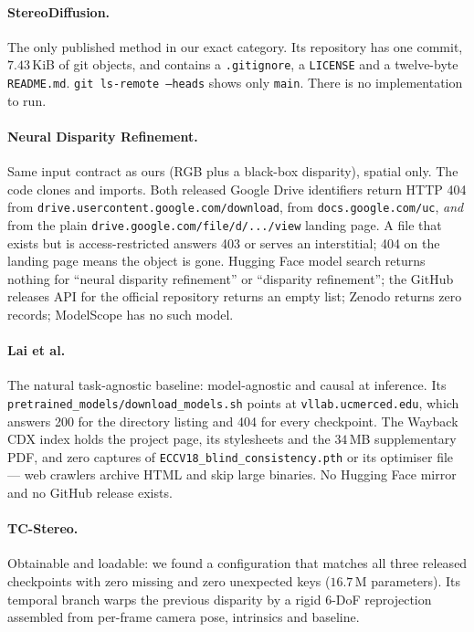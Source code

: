 \documentclass[letterpaper,10pt,conference]{ieeeconf}
\begin{document}
\paragraph{StereoDiffusion.} The only published method in our exact
category. Its repository has one commit, $7.43$\,KiB of git objects, and
contains a \texttt{.gitignore}, a \texttt{LICENSE} and a twelve-byte
\texttt{README.md}. \texttt{git ls-remote --heads} shows only
\texttt{main}. There is no implementation to run.

\paragraph{Neural Disparity Refinement.} Same input contract as ours
(RGB plus a black-box disparity), spatial only. The code clones and
imports. Both released Google Drive identifiers return HTTP 404 from
\texttt{drive.usercontent.google.com/download}, from
\texttt{docs.google.com/uc}, \emph{and} from the plain
\texttt{drive.google.com/file/d/.../view} landing page. A file that
exists but is access-restricted answers 403 or serves an interstitial;
404 on the landing page means the object is gone. Hugging Face model
search returns nothing for ``neural disparity refinement'' or
``disparity refinement''; the GitHub releases API for the official
repository returns an empty list; Zenodo returns zero records;
ModelScope has no such model.

\paragraph{Lai et al.} The natural task-agnostic baseline: model-agnostic
and causal at inference. Its
\texttt{pretrained\_models/download\_models.sh} points at
\texttt{vllab.ucmerced.edu}, which answers 200 for the directory listing
and 404 for every checkpoint. The Wayback CDX index holds the project
page, its stylesheets and the $34$\,MB supplementary PDF, and zero
captures of \texttt{ECCV18\_blind\_consistency.pth} or its optimiser
file --- web crawlers archive HTML and skip large binaries. No Hugging
Face mirror and no GitHub release exists.

\paragraph{TC-Stereo.} Obtainable and loadable: we found a configuration
that matches all three released checkpoints with zero missing and zero
unexpected keys ($16.7$\,M parameters). Its temporal branch warps the
previous disparity by a rigid $6$-DoF reprojection assembled from
per-frame camera pose, intrinsics and baseline.
\end{document}
